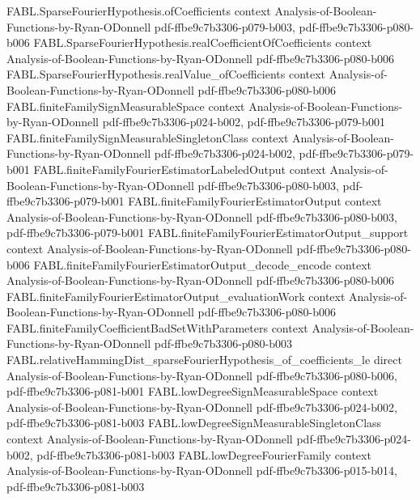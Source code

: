 \begin{theorem}
  {FABL.SparseFourierHypothesis.ofCoefficients}
  {context}
  {Analysis-of-Boolean-Functions-by-Ryan-ODonnell}
  {pdf-ffbe9c7b3306-p079-b003,
    pdf-ffbe9c7b3306-p080-b006}
\proofstep
  {FABL.SparseFourierHypothesis.realCoefficientOfCoefficients}
  {context}
  {Analysis-of-Boolean-Functions-by-Ryan-ODonnell}
  {pdf-ffbe9c7b3306-p080-b006}
\proofstep
  {FABL.SparseFourierHypothesis.realValue_ofCoefficients}
  {context}
  {Analysis-of-Boolean-Functions-by-Ryan-ODonnell}
  {pdf-ffbe9c7b3306-p080-b006}
\proofstep
  {FABL.finiteFamilySignMeasurableSpace}
  {context}
  {Analysis-of-Boolean-Functions-by-Ryan-ODonnell}
  {pdf-ffbe9c7b3306-p024-b002,
    pdf-ffbe9c7b3306-p079-b001}
\proofstep
  {FABL.finiteFamilySignMeasurableSingletonClass}
  {context}
  {Analysis-of-Boolean-Functions-by-Ryan-ODonnell}
  {pdf-ffbe9c7b3306-p024-b002,
    pdf-ffbe9c7b3306-p079-b001}
\proofstep
  {FABL.finiteFamilyFourierEstimatorLabeledOutput}
  {context}
  {Analysis-of-Boolean-Functions-by-Ryan-ODonnell}
  {pdf-ffbe9c7b3306-p080-b003,
    pdf-ffbe9c7b3306-p079-b001}
\proofstep
  {FABL.finiteFamilyFourierEstimatorOutput}
  {context}
  {Analysis-of-Boolean-Functions-by-Ryan-ODonnell}
  {pdf-ffbe9c7b3306-p080-b003,
    pdf-ffbe9c7b3306-p079-b001}
\proofstep
  {FABL.finiteFamilyFourierEstimatorOutput_support}
  {context}
  {Analysis-of-Boolean-Functions-by-Ryan-ODonnell}
  {pdf-ffbe9c7b3306-p080-b006}
\proofstep
  {FABL.finiteFamilyFourierEstimatorOutput_decode_encode}
  {context}
  {Analysis-of-Boolean-Functions-by-Ryan-ODonnell}
  {pdf-ffbe9c7b3306-p080-b006}
\proofstep
  {FABL.finiteFamilyFourierEstimatorOutput_evaluationWork}
  {context}
  {Analysis-of-Boolean-Functions-by-Ryan-ODonnell}
  {pdf-ffbe9c7b3306-p080-b006}
\proofstep
  {FABL.finiteFamilyCoefficientBadSetWithParameters}
  {context}
  {Analysis-of-Boolean-Functions-by-Ryan-ODonnell}
  {pdf-ffbe9c7b3306-p080-b003}
\proofstep
  {FABL.relativeHammingDist_sparseFourierHypothesis_of_coefficients_le}
  {direct}
  {Analysis-of-Boolean-Functions-by-Ryan-ODonnell}
  {pdf-ffbe9c7b3306-p080-b006,
    pdf-ffbe9c7b3306-p081-b001}
\proofstep
  {FABL.lowDegreeSignMeasurableSpace}
  {context}
  {Analysis-of-Boolean-Functions-by-Ryan-ODonnell}
  {pdf-ffbe9c7b3306-p024-b002,
    pdf-ffbe9c7b3306-p081-b003}
\proofstep
  {FABL.lowDegreeSignMeasurableSingletonClass}
  {context}
  {Analysis-of-Boolean-Functions-by-Ryan-ODonnell}
  {pdf-ffbe9c7b3306-p024-b002,
    pdf-ffbe9c7b3306-p081-b003}
\proofstep
  {FABL.lowDegreeFourierFamily}
  {context}
  {Analysis-of-Boolean-Functions-by-Ryan-ODonnell}
  {pdf-ffbe9c7b3306-p015-b014,
    pdf-ffbe9c7b3306-p081-b003}

\end{theorem}
